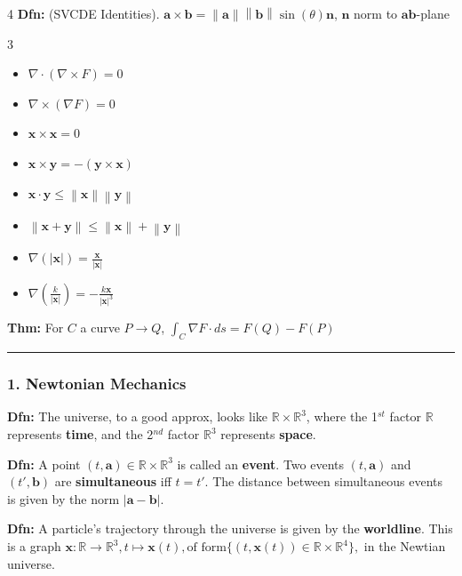 \documentclass[landscape, 8pt]{extarticle}
\begin{document}
\begin{multicols*}{4}
		\textbf{Dfn:} (SVCDE Identities). $\bm{a} \times \bm{b} = \left\lVert \bm{a}\right\rVert \left\lVert \bm{b}\right\rVert \sin( \theta) \bm{n}$, $\bm{n}$ norm to $\bm{ab}$-plane
		\vspace{-10pt}
		\begin{multicols}{3}
			\begin{itemize}
				\item $\nabla\cdot(\nabla\times F)=0$
				\item $\nabla\times(\nabla F)=0$
				\item $\mathbf{x} \times \mathbf{x} = 0$
				\item $\mathbf{x} \times \mathbf{y} = - (\mathbf{y} \times \mathbf{x})$
				\item $\mathbf{x} \cdot \mathbf{y} \le \left\lVert \mathbf{x}\right\rVert \left\lVert \mathbf{y}\right\rVert$
				\item $\left\lVert \mathbf{x} + \mathbf{y}\right\rVert \le \left\lVert \mathbf{x}\right\rVert + \left\lVert \mathbf{y}\right\rVert$
				\item $\nabla(|\mathbf{x}|)=\frac{\mathbf{x}}{|\mathbf{x}|}$
				\item $\nabla\!(\frac{k}{|\mathbf{x}|})=-\frac{k\mathbf{x}}{|\mathbf{x}|^3}$
			\end{itemize}
		\end{multicols}
		\vspace{-10pt}
		\textbf{Thm:} For $C$ a curve $P \to Q$, $\int_C \nabla F\cdot ds = F(Q)-F(P)$
		
		\hrule
		\vspace*{-3pt}
		\subsubsection*{\tiny{1. Newtonian Mechanics}}
		\vspace*{-6pt}
		
		\textbf{Dfn:} The universe, to a good approx, looks like $\mathbb{R}\times\mathbb{R}^3$, where the 1$^{st}$ factor $\mathbb{R}$ represents \textbf{time}, and the 2$^{nd}$ factor $\mathbb{R}^3$ represents \textbf{space}.
		
		\textbf{Dfn:} A point $(t,\mathbf{a})\in\mathbb{R}\times\mathbb{R}^3$ is called an \textbf{event}. Two events $(t,\mathbf{a})$ and $(t',\mathbf{b})$ are \textbf{simultaneous} iff $t=t'$. The distance between simultaneous events is given by the norm $|\mathbf{a}-\mathbf{b}|$.
		
		\textbf{Dfn:} A particle's trajectory through the universe is given by the \textbf{worldline}. This is a graph
		$
		\mathbf{x}:\mathbb{R}\to\mathbb{R}^3, t\mapsto \mathbf{x}(t),\text{of form}\{(t,\mathbf{x}(t))\in\mathbb{R}\times\mathbb{R}^4\},
		$
		in the Newtian universe.
		

\end{multicols*}
\end{document}
